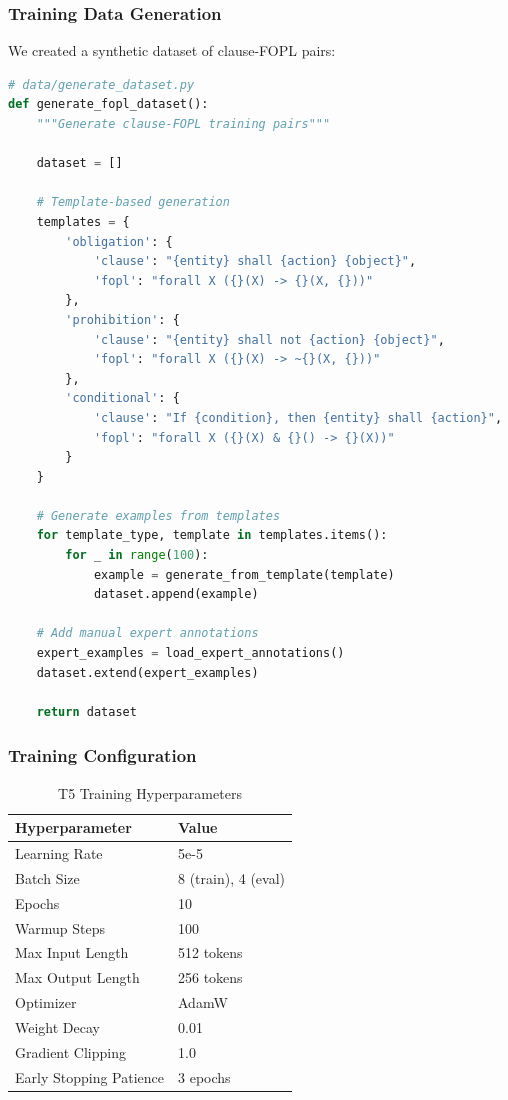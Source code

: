 \documentclass[12pt,a4paper]{article}
\begin{document}
\subsubsection{Training Data Generation}

We created a synthetic dataset of clause-FOPL pairs:

\begin{lstlisting}[language=Python, caption=Synthetic FOPL Dataset Generation]
# data/generate_dataset.py
def generate_fopl_dataset():
    """Generate clause-FOPL training pairs"""
    
    dataset = []
    
    # Template-based generation
    templates = {
        'obligation': {
            'clause': "{entity} shall {action} {object}",
            'fopl': "forall X ({}(X) -> {}(X, {}))"
        },
        'prohibition': {
            'clause': "{entity} shall not {action} {object}",
            'fopl': "forall X ({}(X) -> ~{}(X, {}))"
        },
        'conditional': {
            'clause': "If {condition}, then {entity} shall {action}",
            'fopl': "forall X ({}(X) & {}() -> {}(X))"
        }
    }
    
    # Generate examples from templates
    for template_type, template in templates.items():
        for _ in range(100):
            example = generate_from_template(template)
            dataset.append(example)
    
    # Add manual expert annotations
    expert_examples = load_expert_annotations()
    dataset.extend(expert_examples)
    
    return dataset
\end{lstlisting}

\subsubsection{Training Configuration}

\begin{table}[H]
\centering
\begin{tabular}{|l|l|}
\hline
\textbf{Hyperparameter} & \textbf{Value} \\
\hline
Learning Rate & 5e-5 \\
Batch Size & 8 (train), 4 (eval) \\
Epochs & 10 \\
Warmup Steps & 100 \\
Max Input Length & 512 tokens \\
Max Output Length & 256 tokens \\
Optimizer & AdamW \\
Weight Decay & 0.01 \\
Gradient Clipping & 1.0 \\
Early Stopping Patience & 3 epochs \\
\hline
\end{tabular}
\caption{T5 Training Hyperparameters}
\end{table}
\end{document}
